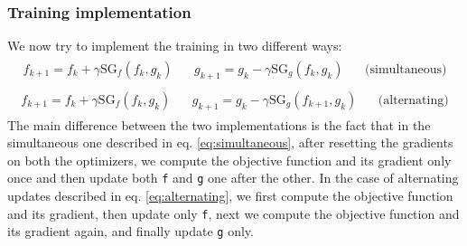 \documentclass[12pt]{article}
\begin{document}
\subsubsection{Training implementation} \label{subsub:gan-train-impl}

We now try to implement the training in two different ways:
\begin{align}
\begin{aligned} \label{eq:simultaneous}
    f_{k+1} = f_{k} + \gamma \text{SG}_{f}(f_{k}, g_{k}) \ \ \ \  & g_{k+1} = g_{k} - \gamma \text{SG}_{g}(f_{k}, g_{k}) & \ \ \ \ \text{(simultaneous)}
\end{aligned}
\end{align}
\begin{align}
\begin{aligned} \label{eq:alternating}
    f_{k+1} = f_{k} + \gamma \text{SG}_{f}(f_{k}, g_{k}) \ \ \ \  & g_{k+1} = g_{k} - \gamma \text{SG}_{g}(f_{k+1}, g_{k}) & \ \ \ \ \text{(alternating)}
\end{aligned}
\end{align}
The main difference between the two implementations is the fact that in the simultaneous one described in eq. \eqref{eq:simultaneous}, after resetting the gradients on both the optimizers, we compute the objective function and its gradient only once and then update both \texttt{f} and \texttt{g} one after the other. In the case of alternating updates described in eq. \eqref{eq:alternating}, we first compute the objective function and its gradient, then update only \texttt{f}, next we compute the objective function and its gradient again, and finally update \texttt{g} only.
\end{document}

